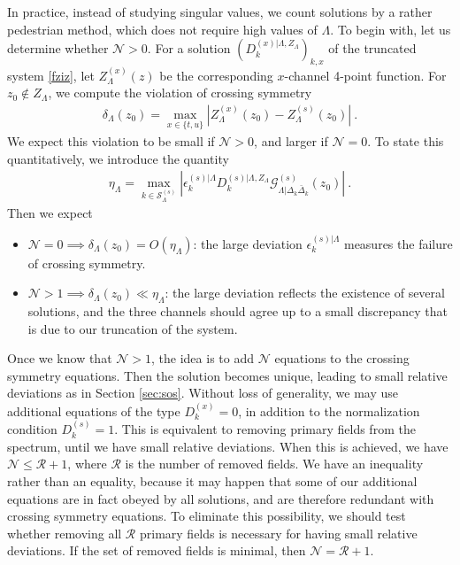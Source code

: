 \documentclass[12pt, a4paper]{article}
\theoremstyle{break}
\begin{document}
In practice, instead of studying singular values, we count solutions by a rather pedestrian method, which does not require high values of $\Lambda$. To begin with, let us determine whether $\mathcal{N}>0$. For a solution $\left(D_k^{(x)|\Lambda,Z_\Lambda}\right)_{k,x}$ of the truncated system \eqref{fziz}, let $Z^{(x)}_\Lambda(z)$ be the corresponding $x$-channel 4-point function. For $z_0\notin Z_\Lambda$, we compute the violation of crossing symmetry 
\begin{align}
 \delta_\Lambda(z_0) = \max_{x\in\{t,u\}} \left|Z^{(x)}_\Lambda(z_0)-Z^{(s)}_\Lambda(z_0)\right|\ . 
\end{align}
We expect this violation to be small if $\mathcal{N}>0$, and larger if $\mathcal{N}=0$. To state this  quantitatively, we introduce the quantity 
\begin{align}
 \eta_\Lambda = \max_{k\in \mathcal{S}_\Lambda^{(s)}} \left|\epsilon_k^{(s)|\Lambda} D_k^{(s)|\Lambda,Z_\Lambda}\mathcal{G}^{(s)}_{\Lambda|\Delta_k\bar\Delta_k}(z_0)\right| \ .
\end{align}
Then we expect
\begin{itemize}
 \item $\mathcal{N}=0\implies \delta_\Lambda(z_0) = O(\eta_\Lambda)$: the large deviation $\epsilon_k^{(s)|\Lambda}$ measures the failure of crossing symmetry.
 \item $\mathcal{N}>1\implies \delta_\Lambda(z_0) \ll \eta_\Lambda$: the large deviation reflects the existence of several solutions, and the three channels should agree up to a small discrepancy that is due to our truncation of the system. 
\end{itemize}
Once we know that $\mathcal{N}>1$, the idea is to add $\mathcal{N}$ equations to the crossing symmetry equations. Then the solution becomes unique, leading to small relative deviations as in Section \ref{sec:sos}. Without loss of generality, we may use additional equations of the type $D^{(x)}_k=0$, in addition to the normalization condition $D^{(s)}_k=1$. This is equivalent to removing primary fields from the spectrum, until we have small relative deviations. When this is achieved, we have $\mathcal{N}\leq \mathcal{R}+1$, where $\mathcal{R}$ is the number of removed fields. We have an inequality rather than an equality, because it may happen that some of our additional equations are in fact obeyed by all solutions, and are therefore redundant with crossing symmetry equations. To eliminate this possibility, we should test whether removing all $\mathcal{R}$ primary fields is necessary for having small relative deviations. If the set of removed fields is minimal, then $\mathcal{N}= \mathcal{R}+1$.
\end{document}
